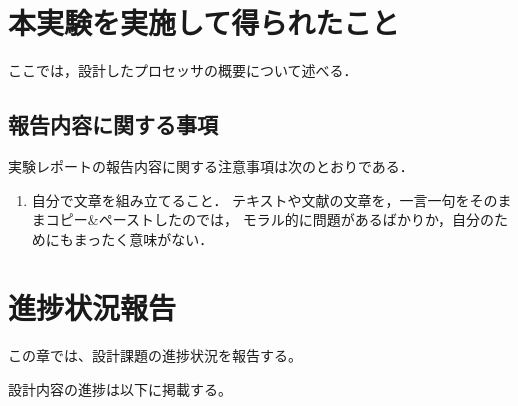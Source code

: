 \documentclass{jarticle}[11pt]
\begin{document}

\section{本実験を実施して得られたこと}
\label{sec:本実験を実施して得られたこと}

ここでは，設計したプロセッサの概要について述べる．

\subsection{報告内容に関する事項}
実験レポートの報告内容に関する注意事項は次のとおりである．
\begin{enumerate}
\item 自分で文章を組み立てること．
テキストや文献の文章を，一言一句をそのままコピー\&ペーストしたのでは，
モラル的に問題があるばかりか，自分のためにもまったく意味がない．
\end{enumerate}




\section{進捗状況報告}
\label{sec:進捗状況報告}

この章では、設計課題の進捗状況を報告する。

設計内容の進捗は以下に掲載する。
\end{document}
